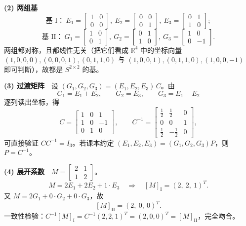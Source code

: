 \documentclass[10pt]{ctexart}
\newcommand{\R}{\mathbb{R}}
\begin{document}
\textbf{(2) 两组基}
\[
\text{基 I：}\ E_1=\begin{bmatrix}1&0\\0&0\end{bmatrix},\ E_2=\begin{bmatrix}0&0\\0&1\end{bmatrix},\ E_3=\begin{bmatrix}0&1\\1&0\end{bmatrix};
\]
\[
\text{基 II：}\ G_1=\begin{bmatrix}1&0\\0&1\end{bmatrix},\ G_2=\begin{bmatrix}0&1\\1&0\end{bmatrix},\ G_3=\begin{bmatrix}1&0\\0&-1\end{bmatrix}.
\]
两组都对称，且都线性无关（把它们看成 $\R^4$ 中的坐标向量 $(1,0,0,0),(0,0,0,1),(0,1,1,0)$ 与 $(1,0,0,1),(0,1,1,0),(1,0,0,-1)$ 即可判断），故都是 $S^{2\times2}$ 的基。

\textbf{(3) 过渡矩阵}　设 $(G_1,G_2,G_3)=(E_1,E_2,E_3)\,C$。由
\[
G_1=E_1+E_2,\qquad G_2=E_3,\qquad G_3=E_1-E_2
\]
逐列读出坐标，得
\[
C=\begin{bmatrix}1&0&1\\1&0&-1\\0&1&0\end{bmatrix},
\qquad
C^{-1}=\begin{bmatrix}\tfrac12&\tfrac12&0\\0&0&1\\\tfrac12&-\tfrac12&0\end{bmatrix},
\]
可直接验证 $CC^{-1}=I_3$。若课本约定 $(E_1,E_2,E_3)=(G_1,G_2,G_3)P$，则 $P=C^{-1}$。

\textbf{(4) 展开系数}　$M=\begin{bmatrix}2&1\\1&2\end{bmatrix}$。
\[
M=2E_1+2E_2+1\cdot E_3
\quad\Longrightarrow\quad [M]_{\text{I}}=(2,\ 2,\ 1)^{T}.
\]
又 $M=2G_1+0\cdot G_2+0\cdot G_3$，故
\[
[M]_{\text{II}}=(2,\ 0,\ 0)^{T}.
\]
一致性检验：$C^{-1}[M]_{\text{I}}=C^{-1}(2,2,1)^T=(2,0,0)^T=[M]_{\text{II}}$，完全吻合。
\end{document}
